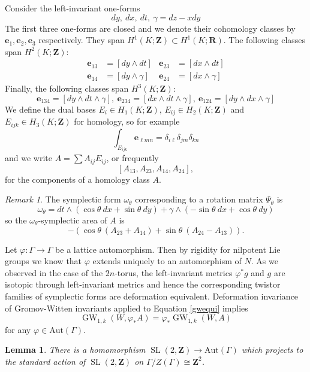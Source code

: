 \documentclass[11pt]{amsart}
\newcommand{\RR}{\mathbf{R}}
\newcommand{\ZZ}{\mathbf{Z}}
\newcommand{\Aut}{\mathrm{Aut}}
\newcommand{\GW}{\operatorname{GW}}
\newcommand{\WW}{W}
\renewcommand{\phi}{\varphi}
\newcommand{\OP}{\operatorname}
\numberwithin{equation}{section}
\newtheorem{lma}[equation]{Lemma}
\theoremstyle{definition}
\theoremstyle{remark}
\newtheorem{rmk}[equation]{Remark}
\begin{document}
Consider the left-invariant one-forms
\[dy,\ dx,\ dt,\ \gamma=dz-xdy\]
The first three one-forms are closed and we denote their cohomology classes by $\mathbf{e}_1,\mathbf{e}_2,\mathbf{e}_3$ respectively. They span $H^1(K;\ZZ)\subset H^1(K;\RR)$. The following classes span $H^2(K;\ZZ)$:
\begin{align*}
\mathbf{e}_{13}&=[dy\wedge dt] & \mathbf{e}_{23}&=[dx\wedge dt]\\
\mathbf{e}_{14}&=[dy\wedge\gamma] & \mathbf{e}_{24}&=[dx\wedge\gamma]
\end{align*}
Finally, the following classes span $H^3(K;\ZZ)$:
\[\mathbf{e}_{134}=[dy\wedge dt\wedge \gamma],\ \mathbf{e}_{234}=[dx\wedge dt\wedge\gamma],\ \mathbf{e}_{124}=[dy\wedge dx\wedge\gamma]\]
We define the dual bases $E_i\in H_1(K;\ZZ)$, $E_{ij}\in H_2(K;\ZZ)$ and $E_{ijk}\in H_3(K;\ZZ)$ for homology, so for example
\[\int_{E_{ijk}}\mathbf{e}_{\ell mn}=\delta_{i\ell}\delta_{jm}\delta_{kn}\]
and we write $A=\sum A_{ij}E_{ij}$, or frequently
\[[A_{13},A_{23},A_{14},A_{24}],\]
for the components of a homology class $A$.
\begin{rmk}
The symplectic form $\omega_{\theta}$ corresponding to a rotation matrix $\Psi_{\theta}$ is
\[\omega_{\theta}=dt\wedge(\cos\theta\ dx+\sin\theta\ dy)+\gamma\wedge(-\sin\theta\ dx+\cos\theta\ dy)\]
so the $\omega_{\theta}$-symplectic area of $A$ is
\[-\left(\cos\theta\ (A_{23}+A_{14})+\sin\theta\ (A_{24}-A_{13})\right).\]
\end{rmk}
Let $\phi\colon\Gamma\to\Gamma$ be a lattice automorphism. Then by rigidity for nilpotent Lie groups \cite[Theorem 2.7]{LGLA} we know that $\phi$ extends uniquely to an automorphism of $N$. As we observed in the case of the $2n$-torus, the left-invariant metrics $\phi^*g$ and $g$ are isotopic through left-invariant metrics and hence the corresponding twistor families of symplectic forms are deformation equivalent. Deformation invariance of Gromov-Witten invariants applied to Equation \eqref{gwequi} implies
\begin{equation}\label{gwinvariance}\GW_{1,k}(\WW,\phi_*A)=\phi_*\GW_{1,k}(\WW,A)\end{equation}
for any $\phi\in\Aut(\Gamma)$.
\begin{lma}\label{autos}
There is a homomorphism $\OP{SL}(2,\ZZ)\to\Aut(\Gamma)$ which projects to the standard action of $\OP{SL}(2,\ZZ)$ on $\Gamma/Z(\Gamma)\cong\ZZ^2$.
\end{lma}
\end{document}
